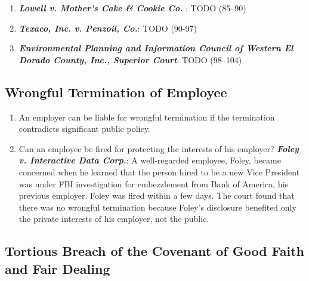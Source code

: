 \begin{enumerate}
    \item \textbf{\emph{Lowell v. Mother's Cake \& Cookie Co. }}: TODO (85--90) %
    \item \textbf{\emph{Texaco, Inc. v. Penzoil, Co.}}: TODO (90-97)
    \item \textbf{\emph{Environmental Planning and Information Council of Western El Dorado County, Inc., Superior Court}}: TODO (98--104)
\end{enumerate}

\subsection{Wrongful Termination of Employee}

\begin{enumerate}
    \item An employer can be liable for wrongful termination if the termination contradicts significant public policy.
    \item Can an employee be fired for protecting the interests of his employer? \textbf{\emph{Foley v. Interactive Data Corp.}}: A well-regarded employee, Foley, became concerned when he learned that the person hired to be a new Vice President was under FBI investigation for embezzlement from Bank of America, his previous employer. Foley was fired within a few days. The court found that there was no wrongful termination because Foley's disclosure benefited only the private interests of his employer, not the public. %
\end{enumerate}

\subsection{Tortious Breach of the Covenant of Good Faith and Fair Dealing}


